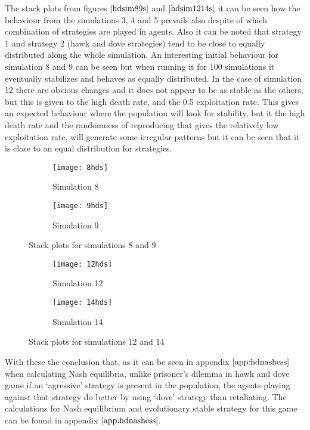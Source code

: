 The stack plots from figures $\ref{hdsim89s}$ and $\ref{hdsim1214s}$ it can be seen how the behaviour from the simulations 3, 4 and 5 prevails also despite of which combination of strategies are played in agents. Also it can be noted that strategy 1 and strategy 2 (hawk and dove strategies) tend to be close to equally distributed along the whole simulation. An interesting initial behaviour for simulation 8 and 9 can be seen but when running it for 100 simulations it eventually stabilizes and behaves as equally distributed. In the case of simulation 12 there are obvious changes and it does not appear to be as stable as the others, but this is given to the high death rate, and the 0.5 exploitation rate. This gives an expected behaviour where the population will look for stability, but it the high death rate and the randomness of reproducing that gives the relatively low exploitation rate, will generate some irregular patterns but it can be seen that it is close to an equal distribution for strategies.

\begin{figure}[H]       
    \centering
    \begin{subfigure}[b]{0.3\textwidth}
	\centering
	{\texttt{[image: 8hds]}}   
    	\caption{Simulation 8}
	\label{fig:hd8s}
    \end{subfigure}
    \hfill
    \begin{subfigure}[b]{0.3\textwidth}
	\centering
	{\texttt{[image: 9hds]}}   
    	\caption{Simulation 9}
	\label{fig:hd9s}
    \end{subfigure}
   \caption{Stack plots for simulations 8 and 9}
    \label{hdsim89s}
\end{figure}

\begin{figure}[H]       
    \centering
    \begin{subfigure}[b]{0.3\textwidth}
	\centering
	{\texttt{[image: 12hds]}}   
    	\caption{Simulation 12}
	\label{fig:hd12s}
    \end{subfigure}
    \hfill
    \begin{subfigure}[b]{0.3\textwidth}
	\centering
	{\texttt{[image: 14hds]}}   
    	\caption{Simulation 14}
	\label{fig:hd14s}
    \end{subfigure}
   \caption{Stack plots for simulations 12 and 14}
    \label{hdsim1214s}
\end{figure}

With these the conclusion that, as it can be seen in appendix $\ref{app:hdnashess}$ when calculating Nash equilibria, unlike prisoner's dilemma in hawk and dove game if an `agressive' strategy is present in the population, the agents playing against that strategy do better by using `dove' strategy than retaliating.  
The calculations for Nash equilibrium and evolutionary stable strategy for this game can be found in appendix $\ref{app:hdnashess}$.


